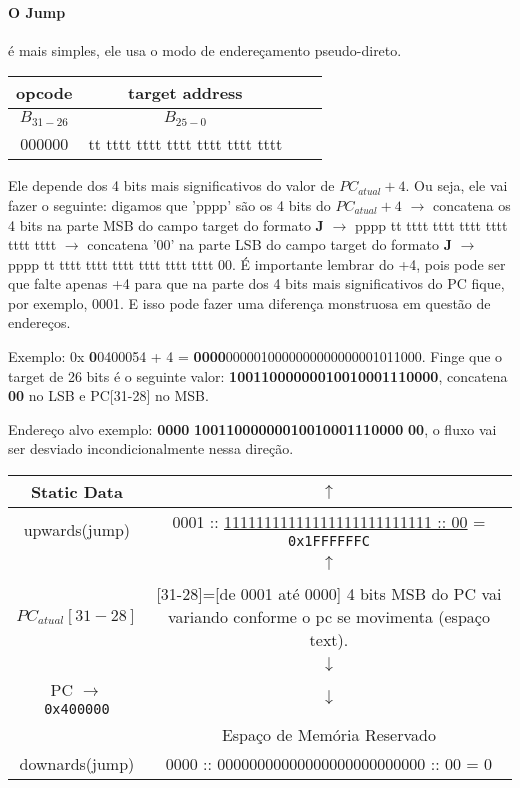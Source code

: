\documentclass{article}
\begin{document}
\paragraph{O Jump} é mais simples, ele usa o modo de endereçamento
pseudo-direto.

\begin{table}[ht!]
  \begin{tabular}{|c|c|c|c|}
    \hline opcode & target address \\
    \hline $B_{31-26}$ & $B_{25-0}$ \\
    \hline 000000 & tt tttt tttt tttt tttt tttt tttt \\
    \hline
  \end{tabular}
\end{table}

Ele depende dos 4 bits mais significativos do valor de $PC_{atual} + 4$. Ou
seja, ele vai fazer o seguinte: digamos que 'pppp' são os 4 bits do $PC_{atual}
+ 4$ $\rightarrow$ concatena os 4 bits na parte MSB do campo target do formato
\textbf{J} $\rightarrow$ pppp tt tttt tttt tttt tttt tttt tttt $\rightarrow$
concatena '00' na parte LSB do campo target do formato \textbf{J} $\rightarrow$
pppp tt tttt tttt tttt tttt tttt tttt 00. É importante lembrar do +4, pois pode
ser que falte apenas +4 para que na parte dos 4 bits mais significativos do PC
fique, por exemplo, 0001. E isso pode fazer uma diferença monstruosa em questão
de endereços.

Exemplo: 0x\textbf{\color{Red} 0}0400054 + 4 = \textbf{\color{Red}
0000}0000010000000000000001011000. Finge que o target de 26 bits é o seguinte
valor: \textbf{\color{Blue} 10011000000010010001110000}, concatena
\textbf{\color{Green} 00} no LSB e PC[31-28] no MSB.

Endereço alvo exemplo: \textbf{\color{Red} 0000}\textbf{\color{Blue}
10011000000010010001110000}\textbf{\color{Green} 00}, o fluxo vai ser desviado
incondicionalmente nessa direção.

\begin{table}[ht!]
\begin{tabular}{|c|c|}
\hline  Static Data & $\uparrow$ \\
\hline upwards(jump) & 0001 :: \underline{11111111111111111111111111 :: 00} =
\verb|0x1FFFFFFC| \\
\hline  & $\uparrow$ \\
\hline  & \\
\hline $PC_{atual}[31-28]$ & [31-28]=[de 0001 até 0000] \tiny{4 bits MSB do PC}
vai variando conforme o pc se movimenta (espaço text).
\\
\hline  & $\downarrow$ \\
\hline PC $\rightarrow$ \verb|0x400000| & $\downarrow$ \\
\hline  & Espaço de Memória Reservado \\
\hline downards(jump) & 0000 :: 00000000000000000000000000 :: 00 = 0 \\
\hline
\end{tabular}
\end{table}
\end{document}
